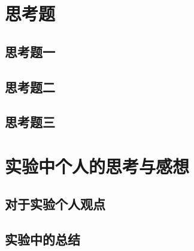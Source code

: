 \documentclass{ctexart}
\begin{document}





\section{思考题}
  \subsection{思考题一}

  \subsection{思考题二}

  \subsection{思考题三}


\section{实验中个人的思考与感想}
  \subsection{对于实验个人观点}
  \subsection{实验中的总结}
\end{document}
